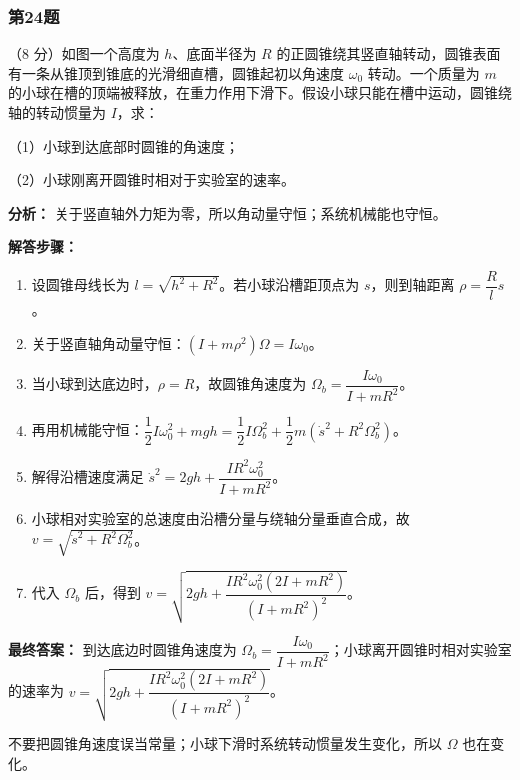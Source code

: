 \documentclass[12pt,a4paper]{ctexart}
\begin{document}
\subsubsection*{第24题}
\begin{tcolorbox}[colback=gray!2!white,colframe=black!60,title={题目}]
（8 分）如图一个高度为 \(h\)、底面半径为 \(R\) 的正圆锥绕其竖直轴转动，圆锥表面有一条从锥顶到锥底的光滑细直槽，圆锥起初以角速度 \(\omega_0\) 转动。一个质量为 \(m\) 的小球在槽的顶端被释放，在重力作用下滑下。假设小球只能在槽中运动，圆锥绕轴的转动惯量为 \(I\)，求：\par
（1）小球到达底部时圆锥的角速度；\par
（2）小球刚离开圆锥时相对于实验室的速率。\par
\end{tcolorbox}
\begin{tcolorbox}[colback=blue!2!white,colframe=blue!55!black,title={完整答案}]
\textbf{分析：}
关于竖直轴外力矩为零，所以角动量守恒；系统机械能也守恒。\par
\textbf{解答步骤：}
\begin{enumerate}
\item 设圆锥母线长为 \(l=\sqrt{h^2+R^2}\)。若小球沿槽距顶点为 \(s\)，则到轴距离 \(\rho=\dfrac{R}{l}s\)。
\item 关于竖直轴角动量守恒：\((I+m\rho^2)\Omega=I\omega_0\)。
\item 当小球到达底边时，\(\rho=R\)，故圆锥角速度为 \(\Omega_b=\dfrac{I\omega_0}{I+mR^2}\)。
\item 再用机械能守恒：\(\dfrac12 I\omega_0^2+mgh=\dfrac12 I\Omega_b^2+\dfrac12 m(\dot s^2+R^2\Omega_b^2)\)。
\item 解得沿槽速度满足 \(\dot s^2=2gh+\dfrac{IR^2\omega_0^2}{I+mR^2}\)。
\item 小球相对实验室的总速度由沿槽分量与绕轴分量垂直合成，故 \(v=\sqrt{\dot s^2+R^2\Omega_b^2}\)。
\item 代入 \(\Omega_b\) 后，得到 \(v=\sqrt{2gh+\dfrac{IR^2\omega_0^2(2I+mR^2)}{(I+mR^2)^2}}\)。
\end{enumerate}
\textbf{最终答案：}
到达底边时圆锥角速度为 \(\Omega_b=\dfrac{I\omega_0}{I+mR^2}\)；小球离开圆锥时相对实验室的速率为 \(v=\sqrt{2gh+\dfrac{IR^2\omega_0^2(2I+mR^2)}{(I+mR^2)^2}}\)。\par
\end{tcolorbox}
\begin{tcolorbox}[colback=red!2!white,colframe=red!55!black,title={易错点}]
不要把圆锥角速度误当常量；小球下滑时系统转动惯量发生变化，所以 \(\Omega\) 也在变化。\par
\end{tcolorbox}
\end{document}
